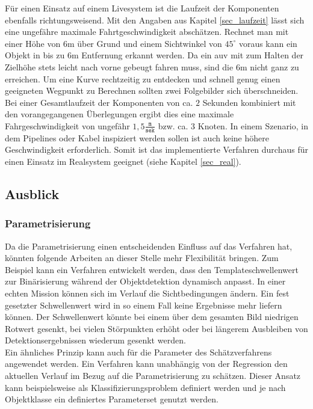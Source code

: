 Für einen Einsatz auf einem Livesystem ist die Laufzeit der Komponenten ebenfalls richtungsweisend. Mit den Angaben aus Kapitel \ref{sec_laufzeit} lässt sich eine ungefähre maximale Fahrtgeschwindigkeit abschätzen. Rechnet man mit einer Höhe von $6$m über Grund und einem Sichtwinkel von $45^\circ$ voraus kann ein Objekt in bis zu $6$m Entfernung erkannt werden. Da ein \gls{auv} mit zum Halten der Zielhöhe stets leicht nach vorne gebeugt fahren muss, sind die $6$m nicht ganz zu erreichen. Um eine Kurve rechtzeitig zu entdecken und schnell genug einen geeigneten Wegpunkt zu Berechnen sollten zwei Folgebilder sich überschneiden.\\
Bei einer Gesamtlaufzeit der Komponenten von ca. $2$ Sekunden kombiniert mit den vorangegangenen Überlegungen ergibt dies eine maximale Fahrgeschwindigkeit von ungefähr $1,5 \frac{\texttt{m}}{\texttt{sek}}$ bzw. ca. $3$ Knoten. In einem Szenario, in dem Pipelines oder Kabel inspiziert werden sollen ist auch keine höhere Geschwindigkeit erforderlich. Somit ist das implementierte Verfahren durchaus für einen Einsatz im Realsystem geeignet (siehe Kapitel \ref{sec_real}).

\subsection{Ausblick}

\subsubsection{Parametrisierung}
Da die Parametrisierung einen entscheidenden Einfluss auf das Verfahren hat, könnten folgende Arbeiten an dieser Stelle mehr Flexibilität bringen. Zum Beispiel kann ein Verfahren entwickelt werden, dass den Templateschwellenwert zur Binärisierung während der Objektdetektion dynamisch anpasst. In einer echten Mission können sich im Verlauf die Sichtbedingungen ändern. Ein fest gesetzter Schwellenwert wird in so einem Fall keine Ergebnisse mehr liefern können. Der Schwellenwert könnte bei einem über dem gesamten Bild niedrigen Rotwert gesenkt, bei vielen Störpunkten erhöht oder bei längerem Ausbleiben von Detektionsergebnissen wiederum gesenkt werden.\\

Ein ähnliches Prinzip kann auch für die Parameter des Schätzverfahrens angewendet werden. Ein Verfahren kann unabhängig von der Regression den aktuellen Verlauf im Bezug auf die Parametrisierung zu schätzen. Dieser Ansatz kann beispielsweise als Klassifizierungsproblem definiert werden und je nach Objektklasse ein definiertes Parameterset genutzt werden.

